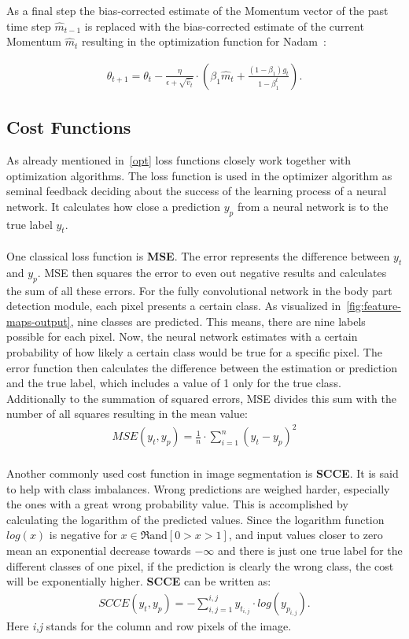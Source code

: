 As a final step the bias-corrected estimate of the Momentum vector of the past time step $\hat{m}_{t-1}$ is replaced
with the bias-corrected estimate of the current Momentum $\hat{m}_{t}$ resulting in the optimization function for
\gls{Nadam}~\cite{optimizersoverview}:



\begin{align}
    \theta_{t+1} = \theta_{t} - \frac{\eta}{\epsilon+\sqrt{\hat{v}_t}} \cdot (\beta_1\hat{m}_t+\frac{(1-\beta_1)g_t}{1-\beta_1^t}) \label{eqn:nadam:8}.
\end{align}


\subsection{Cost Functions}
\label{cost}
As already mentioned in~\autoref{opt} loss functions closely work together with optimization algorithms.
The loss function is used in the optimizer algorithm as seminal feedback deciding about the success of the learning process of a
neural network.
It calculates how close a prediction $y_p$ from a neural network is to the true label $y_t$.
\\\mbox{}\\
One classical loss function is \textbf{\gls{MSE}}.
The error represents the difference between $y_t$ and $y_p$.
\gls{MSE} then squares the error to even out negative results and calculates the sum of all these errors.
For the fully convolutional network in the body part detection module, each pixel presents a certain class.
As visualized in~\ref{fig:feature-maps-output}, nine classes are predicted.
This means, there are nine labels possible for each pixel.
Now, the neural network estimates with a certain probability of how likely a certain class would be true for a specific pixel.
The error function then calculates the difference between the estimation or prediction and the true label, which includes a
value of 1 only for the true class.
Additionally to the summation of squared errors, \gls{MSE} divides this sum with the number of all squares resulting
in the mean
value:
\\
\begin{align}
    MSE(y_t,y_p) = \frac{1}{n}\cdot\sum_{i=1}^n(y_t-y_p)^2
\end{align}
\\
Another commonly used cost function in image segmentation is \textbf{\gls{SCCE}}.
It is said to help with class imbalances.
Wrong predictions are weighed harder, especially the ones with a great wrong probability value.
This is accomplished by calculating the logarithm of the predicted values.
Since the logarithm function $log(x)$ is negative for $x \in \Re \text{and} [0>x>1]$, and input values closer to zero
mean
an exponential decrease towards $-\infty$ and there is just one true label for the different classes of one pixel, if
the prediction is clearly the wrong class, the cost will be exponentially higher.
\textbf{\gls{SCCE}} can be written as:
\begin{align}
    SCCE(y_t,y_p) = -\sum_{i,j=1}^{i,j}y_{t_{i,j}}\cdot log(y_{p_{i,j}}).
\end{align}
Here \textit{i,j} stands for the column and row pixels of the image.

